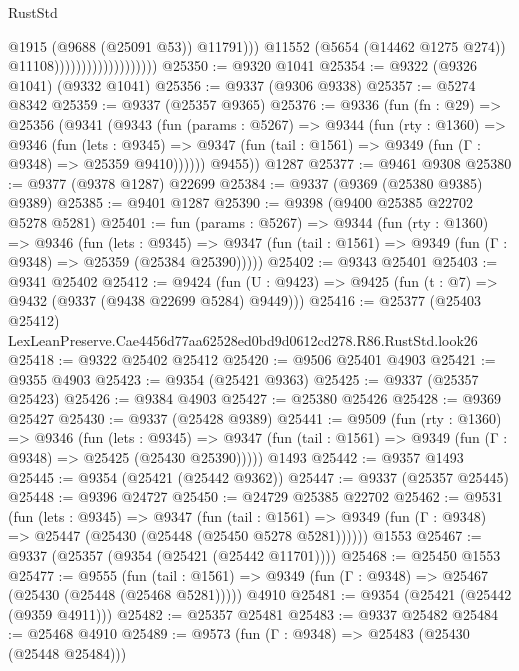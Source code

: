 \begin{lexlean}{RustStd}
\begin{coremodule}
                                                @1915
                                                (@9688 (@25091 @53))
                                                @11791)))
                                          @11552
                                          (@5654 (@14462 @1275 @274))
                                          @11108)))))))))))))))))))
@25350 := @9320 @1041
@25354 := @9322 (@9326 @1041) (@9332 @1041)
@25356 := @9337 (@9306 @9338)
@25357 := @5274 @8342
@25359 := @9337 (@25357 @9365)
@25376 := @9336
    (fun (fn : @29) =>
    @25356
      (@9341
        (@9343
          (fun (params : @5267) =>
          @9344
            (fun (rty : @1360) =>
            @9346
              (fun (lets : @9345) =>
              @9347 (fun (tail : @1561) => @9349 (fun (Γ : @9348) => @25359 @9410))))))
        @9455))
    @1287
@25377 := @9461 @9308
@25380 := @9377 (@9378 @1287) @22699
@25384 := @9337 (@9369 (@25380 @9385) @9389)
@25385 := @9401 @1287
@25390 := @9398 (@9400 @25385 @22702 @5278 @5281)
@25401 := fun (params : @5267) =>
  @9344
    (fun (rty : @1360) =>
    @9346
      (fun (lets : @9345) =>
      @9347 (fun (tail : @1561) => @9349 (fun (Γ : @9348) => @25359 (@25384 @25390)))))
@25402 := @9343 @25401
@25403 := @9341 @25402
@25412 := @9424
    (fun (U : @9423) => @9425 (fun (t : @7) => @9432 (@9337 (@9438 @22699 @5284) @9449)))
@25416 := @25377
    (@25403 @25412)
    LexLeanPreserve.Cae4456d77aa62528ed0bd9d0612cd278.R86.RustStd.look26
@25418 := @9322 @25402 @25412
@25420 := @9506 @25401 @4903
@25421 := @9355 @4903
@25423 := @9354 (@25421 @9363)
@25425 := @9337 (@25357 @25423)
@25426 := @9384 @4903
@25427 := @25380 @25426
@25428 := @9369 @25427
@25430 := @9337 (@25428 @9389)
@25441 := @9509
    (fun (rty : @1360) =>
    @9346
      (fun (lets : @9345) =>
      @9347 (fun (tail : @1561) => @9349 (fun (Γ : @9348) => @25425 (@25430 @25390)))))
    @1493
@25442 := @9357 @1493
@25445 := @9354 (@25421 (@25442 @9362))
@25447 := @9337 (@25357 @25445)
@25448 := @9396 @24727
@25450 := @24729 @25385 @22702
@25462 := @9531
    (fun (lets : @9345) =>
    @9347
      (fun (tail : @1561) =>
      @9349 (fun (Γ : @9348) => @25447 (@25430 (@25448 (@25450 @5278 @5281))))))
    @1553
@25467 := @9337 (@25357 (@9354 (@25421 (@25442 @11701))))
@25468 := @25450 @1553
@25477 := @9555
    (fun (tail : @1561) => @9349 (fun (Γ : @9348) => @25467 (@25430 (@25448 (@25468 @5281)))))
    @4910
@25481 := @9354 (@25421 (@25442 (@9359 @4911)))
@25482 := @25357 @25481
@25483 := @9337 @25482
@25484 := @25468 @4910
@25489 := @9573 (fun (Γ : @9348) => @25483 (@25430 (@25448 @25484)))

\end{coremodule}
\end{lexlean}
